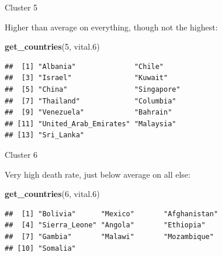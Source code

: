 \documentclass[ignorenonframetext,]{beamer}
\newenvironment{Shaded}{\begin{snugshade}}{\end{snugshade}}
\newcommand{\DecValTok}[1]{\textcolor[rgb]{0.00,0.00,0.81}{#1}}
\newcommand{\FloatTok}[1]{\textcolor[rgb]{0.00,0.00,0.81}{#1}}
\newcommand{\KeywordTok}[1]{\textcolor[rgb]{0.13,0.29,0.53}{\textbf{#1}}}
\newcommand{\NormalTok}[1]{#1}
\begin{document}
\begin{frame}[fragile]{Cluster 5}
\protect\hypertarget{cluster-5}{}

Higher than average on everything, though not the highest:

\begin{Shaded}
\begin{Highlighting}[]
\KeywordTok{get_countries}\NormalTok{(}\DecValTok{5}\NormalTok{, vital}\FloatTok{.6}\NormalTok{)}
\end{Highlighting}
\end{Shaded}

\begin{verbatim}
##  [1] "Albania"              "Chile"               
##  [3] "Israel"               "Kuwait"              
##  [5] "China"                "Singapore"           
##  [7] "Thailand"             "Columbia"            
##  [9] "Venezuela"            "Bahrain"             
## [11] "United_Arab_Emirates" "Malaysia"            
## [13] "Sri_Lanka"
\end{verbatim}

\end{frame}

\begin{frame}[fragile]{Cluster 6}
\protect\hypertarget{cluster-6}{}

Very high death rate, just below average on all else:

\begin{Shaded}
\begin{Highlighting}[]
\KeywordTok{get_countries}\NormalTok{(}\DecValTok{6}\NormalTok{, vital}\FloatTok{.6}\NormalTok{)}
\end{Highlighting}
\end{Shaded}

\begin{verbatim}
##  [1] "Bolivia"      "Mexico"       "Afghanistan" 
##  [4] "Sierra_Leone" "Angola"       "Ethiopia"    
##  [7] "Gambia"       "Malawi"       "Mozambique"  
## [10] "Somalia"
\end{verbatim}

\end{frame}
\end{document}
